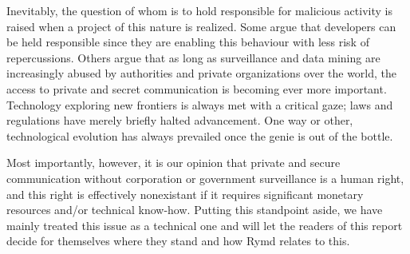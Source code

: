 Inevitably, the question of whom is to hold responsible for malicious activity is raised when a project of this nature is realized. Some argue that developers can be held responsible since they are enabling this behaviour with less risk of repercussions. Others argue that as long as surveillance and data mining are increasingly abused by authorities and private organizations over the world, the access to private and secret communication is becoming ever more important. Technology exploring new frontiers is always met with a critical gaze; laws and regulations have merely briefly halted advancement. One way or other, technological evolution has always prevailed once the genie is out of the bottle.

Most importantly, however, it is our opinion that private and secure communication without corporation or government surveillance is a human right, and this right is effectively nonexistant if it requires significant monetary resources and/or technical know-how. Putting this standpoint aside, we have mainly treated this issue as a technical one and will let the readers of this report decide for themselves where they stand and how Rymd relates to this.
